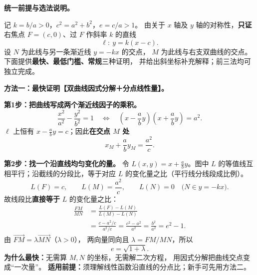 \clearpage
\begin{proofbox}
\textbf{统一前提与选法说明。}

记 $k=b/a>0$，$c^2=a^2+b^2$，$e=c/a>1$。
由关于 $x$ 轴及 $y$ 轴的对称性，\textbf{只证}右焦点
$F=(c,0)$、过 $F$ 作斜率 $k$ 的直线
\[
\ell:\ y=k(x-c).
\]
设 $N$ 为此线与另一条渐近线 $y=-kx$ 的交点，
$M$ 为此线与右支双曲线的交点。
下面提供\textbf{最快、最低门槛、常规}三种证明，
并给出斜坐标补充解释；前三法均可独立完成。

\medskip
\textbf{方法一：最快证明【双曲线因式分解＋分点线性量】。}

\begin{center}\end{center}

\textbf{第1步：把曲线写成两个渐近线因子的乘积。}
\[
\frac{x^2}{a^2}-\frac{y^2}{b^2}=1
\quad\Longleftrightarrow\quad
\left(x-\frac ab y\right)\left(x+\frac ab y\right)=a^2.
\]
$\ell$ 上恒有 $x-\tfrac ab y=c$；因此\textbf{在交点 $M$ 处}
\[
\boxed{x_M+\frac ab y_M=\frac{a^2}{c}}.
\]

\textbf{第2步：找一个沿直线均匀变化的量。}
令 $L(x,y)=x+\tfrac ab y$。图中 $L$ 的等值线互相平行；沿截线的分段比，等于对应 $L$ 的变化量之比（平行线分线段成比例）。
\[
L(F)=c,\qquad L(M)=\frac{a^2}{c},\qquad
L(N)=0
\quad\bigl(N\in y=-kx\bigr).
\]
故线段比\textbf{直接等于} $L$ 的变化量之比：
\[
\begin{aligned}
\frac{FM}{MN}
&=\frac{L(F)-L(M)}{L(M)-L(N)}\\[2pt]
&=\frac{c-a^2/c}{a^2/c}
=\frac{c^2-a^2}{a^2}
=\boxed{\frac{b^2}{a^2}=e^2-1}.
\end{aligned}
\]
由 $\overrightarrow{FM}=\lambda\overrightarrow{MN}$（$\lambda>0$），
两向量同向且 $\lambda=FM/MN$，所以
\[
\boxed{e=\sqrt{1+\lambda}}.
\]
\textbf{为什么最快：}无需算 $M,N$ 的坐标，无需解二次方程，
用因式分解把曲线交点变成“一次量”。
\textbf{适用前提：}须理解线性函数沿直线的分点比；新手可先用方法二。
\end{proofbox}


